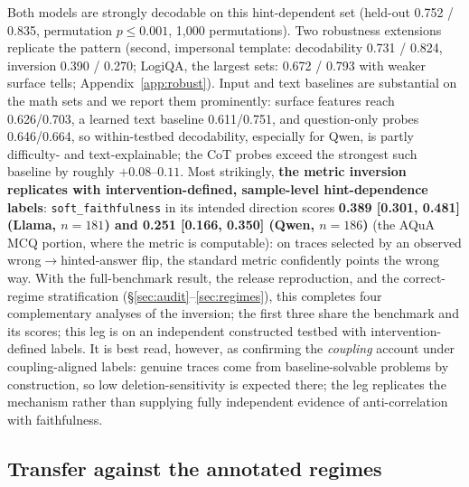\documentclass{article}
\begin{document}
Both models are strongly decodable on this hint-dependent set (held-out 0.752 / 0.835, permutation $p{\leq}0.001$, 1{,}000 permutations). Two robustness extensions replicate the pattern (second, impersonal template: decodability 0.731 / 0.824, inversion 0.390 / 0.270; LogiQA, the largest sets: 0.672 / 0.793 with weaker surface tells; Appendix~\ref{app:robust}). Input and text baselines are substantial on the math sets and we report them prominently: surface features reach 0.626/0.703, a learned text baseline 0.611/0.751, and question-only probes 0.646/0.664, so within-testbed decodability, especially for Qwen, is partly difficulty- and text-explainable; the CoT probes exceed the strongest such baseline by roughly $+0.08$--$0.11$. Most strikingly, \textbf{the metric inversion replicates with intervention-defined, sample-level hint-dependence labels}: \texttt{soft\_faithfulness} in its intended direction scores \textbf{0.389 [0.301, 0.481] (Llama, $n{=}181$) and 0.251 [0.166, 0.350] (Qwen, $n{=}186$)} (the AQuA MCQ portion, where the metric is computable): on traces selected by an observed wrong$\to$hinted-answer flip, the standard metric confidently points the wrong way. With the full-benchmark result, the release reproduction, and the correct-regime stratification (\S\ref{sec:audit}--\ref{sec:regimes}), this completes four complementary analyses of the inversion; the first three share the benchmark and its scores; this leg is on an independent constructed testbed with intervention-defined labels. It is best read, however, as confirming the \emph{coupling} account under coupling-aligned labels: genuine traces come from baseline-solvable problems by construction, so low deletion-sensitivity is expected there; the leg replicates the mechanism rather than supplying fully independent evidence of anti-correlation with faithfulness.

\subsection{Transfer against the annotated regimes}
\label{sec:bridge}
\end{document}
